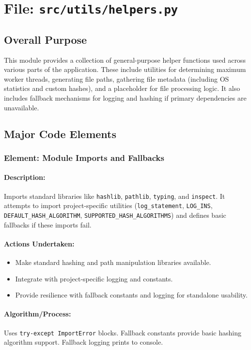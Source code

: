 \documentclass{article}
\begin{document}
\newpage
\section{File: \texttt{src/utils/helpers.py}}
\subsection{Overall Purpose}
This module provides a collection of general-purpose helper functions used across various parts of the application. These include utilities for determining maximum worker threads, generating file paths, gathering file metadata (including OS statistics and custom hashes), and a placeholder for file processing logic. It also includes fallback mechanisms for logging and hashing if primary dependencies are unavailable.

\subsection{Major Code Elements}

\subsubsection{Element: Module Imports and Fallbacks}
\paragraph{Description:} Imports standard libraries like \texttt{hashlib}, \texttt{pathlib}, \texttt{typing}, and \texttt{inspect}. It attempts to import project-specific utilities (\texttt{log\_statement}, \texttt{LOG\_INS}, \texttt{DEFAULT\_HASH\_ALGORITHM}, \texttt{SUPPORTED\_HASH\_ALGORITHMS}) and defines basic fallbacks if these imports fail.
\paragraph{Actions Undertaken:}
\begin{itemize}
    \item Make standard hashing and path manipulation libraries available.
    \item Integrate with project-specific logging and constants.
    \item Provide resilience with fallback constants and logging for standalone usability.
\end{itemize}
\paragraph{Algorithm/Process:} Uses \texttt{try-except ImportError} blocks. Fallback constants provide basic hashing algorithm support. Fallback logging prints to console.
\end{document}
